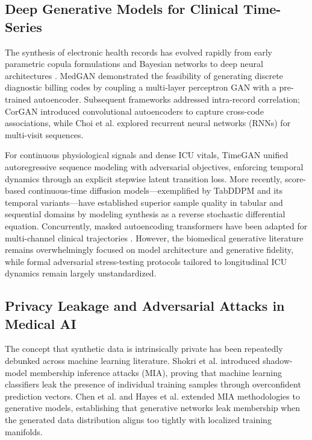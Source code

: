 \documentclass[journal]{IEEEtran}
\begin{document}
\subsection{Deep Generative Models for Clinical Time-Series}
The synthesis of electronic health records has evolved rapidly from early parametric copula formulations and Bayesian networks to deep neural architectures \cite{choi2017generating, tucker2020generating}. MedGAN \cite{choi2017generating} demonstrated the feasibility of generating discrete diagnostic billing codes by coupling a multi-layer perceptron GAN with a pre-trained autoencoder. Subsequent frameworks addressed intra-record correlation; CorGAN \cite{torfi2020corgan} introduced convolutional autoencoders to capture cross-code associations, while Choi et al. \cite{choi2016mime} explored recurrent neural networks (RNNs) for multi-visit sequences.

For continuous physiological signals and dense ICU vitals, TimeGAN \cite{yoon2019timegan} unified autoregressive sequence modeling with adversarial objectives, enforcing temporal dynamics through an explicit stepwise latent transition loss. More recently, score-based continuous-time diffusion models---exemplified by TabDDPM \cite{kotelnikov2023tabddpm} and its temporal variants---have established superior sample quality in tabular and sequential domains by modeling synthesis as a reverse stochastic differential equation. Concurrently, masked autoencoding transformers have been adapted for multi-channel clinical trajectories \cite{hur2022unifying}. However, the biomedical generative literature remains overwhelmingly focused on model architecture and generative fidelity, while formal adversarial stress-testing protocols tailored to longitudinal ICU dynamics remain largely unstandardized.

\subsection{Privacy Leakage and Adversarial Attacks in Medical AI}
The concept that synthetic data is intrinsically private has been repeatedly debunked across machine learning literature. Shokri et al. \cite{shokri2017membership} introduced shadow-model membership inference attacks (MIA), proving that machine learning classifiers leak the presence of individual training samples through overconfident prediction vectors. Chen et al. \cite{chen2020gan} and Hayes et al. \cite{hayes2019logan} extended MIA methodologies to generative models, establishing that generative networks leak membership when the generated data distribution aligns too tightly with localized training manifolds.
\end{document}

